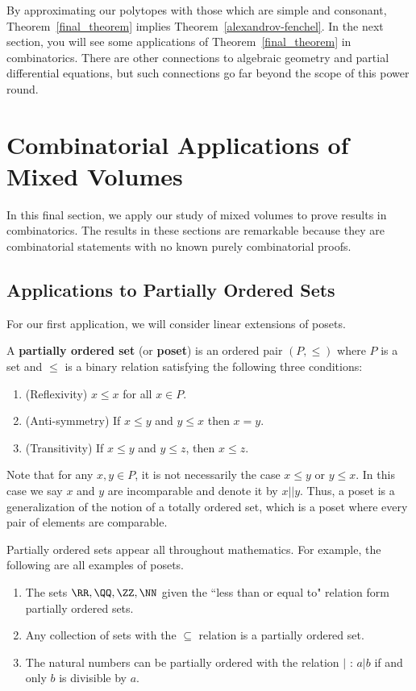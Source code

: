 \documentclass[11pt]{article}
\begin{document}
By approximating our polytopes with those which are simple and consonant, Theorem~\ref{final_theorem} implies Theorem~\ref{alexandrov-fenchel}. In the next section, you will see some applications of Theorem~\ref{final_theorem} in combinatorics. There are other connections to algebraic geometry and partial differential equations, but such connections go far beyond the scope of this power round. 

\newpage
\section{Combinatorial Applications of Mixed Volumes}

In this final section, we apply our study of mixed volumes to prove results in combinatorics. The results in these sections are remarkable because they are combinatorial statements with no known purely combinatorial proofs. 

\subsection{Applications to Partially Ordered Sets}
For our first application, we will consider linear extensions of posets. 
\begin{defn}
    A \textbf{partially ordered set} (or \textbf{poset}) is an ordered pair $(P, \leq)$ where $P$ is a set and $\leq$ is a binary relation satisfying the following three conditions:
    \begin{enumerate}[label = (\roman*)]
        \item (Reflexivity) $x \leq x$ for all $x \in P$. 
        \item (Anti-symmetry) If $x \leq y$ and $y \leq x$ then $x = y$. 
        \item (Transitivity) If $x \leq y$ and $y \leq z$, then $x \leq z$. 
    \end{enumerate}
\end{defn}
Note that for any $x, y \in P$, it is not necessarily the case $x \leq y$ or $y \leq x$. In this case we say $x$ and $y$ are incomparable and denote it by $x || y$. Thus, a poset is a generalization of the notion of a totally ordered set, which is a poset where every pair of elements are comparable. 

\begin{example}
 Partially ordered sets appear all throughout mathematics. For example, the following are all examples of posets.
 \begin{enumerate}[label = (\roman*)]
     \item The sets $\RR, \QQ, \ZZ, \NN$ given the ``less than or equal to" relation form partially ordered sets.
     \item Any collection of sets with the $\subseteq$ relation is a partially ordered set. 
     \item The natural numbers can be partially ordered with the relation $|$ : $a | b$ if and only $b$ is divisible by $a$. 
 \end{enumerate}
\end{example}
\end{document}

